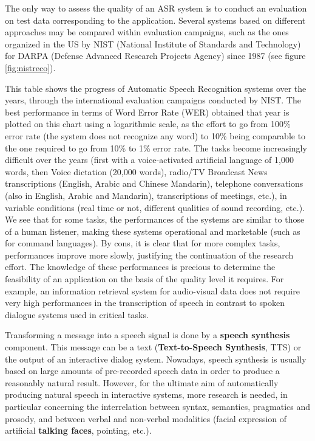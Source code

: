 \begin{multicols}{2}
The only way to assess the quality of an ASR system is to conduct an
evaluation on test data corresponding to the application. Several
systems based on different approaches may be compared within
evaluation campaigns, such as the ones organized in the US by NIST
(National Institute of Standards and Technology) for DARPA (Defense
Advanced Research Projects Agency) since 1987 (see figure
\ref{fig:nistreco}).

This table shows the progress of Automatic Speech Recognition systems
over the years, through the international evaluation campaigns
conducted by NIST.  The best performance in terms of Word Error Rate
(WER) obtained that year is plotted on this chart using a logarithmic
scale, as the effort to go from 100\% error rate (the system does not
recognize any word) to 10\% being comparable to the one required to go
from 10\% to 1\% error rate. The tasks become increasingly difficult
over the years (first with a voice-activated artificial language of
1,000 words, then Voice dictation (20,000 words), radio/TV Broadcast
News transcriptions (English, Arabic and Chinese Mandarin), telephone
conversations (also in English, Arabic and Mandarin), transcriptions
of meetings, etc.), in variable conditions (real time or not,
different qualities of sound recording, etc.). We see that for some
tasks, the performances of the systems are similar to those of a human
listener, making these systems operational and marketable (such as for
command languages). By cons, it is clear that for more complex tasks,
performances improve more slowly, justifying the continuation of the
research effort. The knowledge of these performances is precious to
determine the feasibility of an application on the basis of the
quality level it requires. For example, an information retrieval
system for audio-visual data does not require very high performances
in the transcription of speech in contrast to spoken dialogue systems
used in critical tasks.

Transforming a message into a speech signal is done by a {\bf speech
synthesis} component. This message can be a text ({\bf Text-to-Speech
Synthesis}, TTS) or the output of an interactive dialog system. Nowadays,
speech synthesis is usually based on large amounts of pre-recorded
speech data in order to produce a reasonably natural result. However,
for the ultimate aim of automatically producing natural speech in
interactive systems, more research is needed, in particular concerning
the interrelation between syntax, semantics, pragmatics and prosody,
and between verbal and non-verbal modalities (facial expression of
artificial {\bf talking faces}, pointing, etc.).


\end{multicols}
